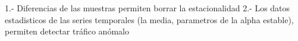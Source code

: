 


1.- Diferencias de las muestras permiten borrar la estacionalidad
2.- Los datos estadisticos de las series temporales (la media, parametros de la alpha estable), permiten detectar tráfico anómalo